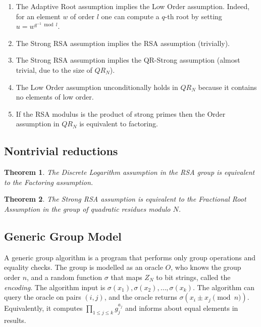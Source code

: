\documentclass[a4paper]{article}
\newtheorem{theorem}{Theorem}
\begin{document}
\begin{enumerate}
    \item The Adaptive Root assumption implies the Low Order assumption. Indeed, for an element $w$ of order $l$ one can compute a $q$-th root by setting $u = w^{q^{-1}\bmod{l}}$. 
    \item The Strong RSA assumption implies the RSA assumption (trivially).
    \item The Strong RSA assumption implies the QR-Strong assumption (almost trivial, due to the size of $QR_N$).
    \item The Low Order assumption unconditionally holds in $QR_N$ because it contains no elements of low order.
    \item If the RSA modulus is the product of strong primes then the Order assumption in $QR_N$ is equivalent to factoring.
\end{enumerate}

\subsection{Nontrivial reductions}
\begin{theorem}\cite{bach1984discrete}
The Discrete Logarithm assumption in the RSA group is equivalent to the Factoring assumption.
\end{theorem}

\begin{theorem}\cite[Th. 1]{DBLP:conf/ccs/CramerS99}
The Strong RSA assumption is equivalent to the Fractional Root Assumption in the group of quadratic residues modulo $N$.
\end{theorem}

\subsection{Generic Group Model}

A generic group algorithm is a program that performs only group operations and equality checks. The group is modelled as an oracle $O$, who knows the group order $n$, and a random function $\sigma$ that maps $Z_N$ to bit strings, called the \emph{encoding}. The algorithm input is $\sigma(x_1),\sigma(x_2),\ldots,\sigma(x_k)$. The algorithm can query the oracle on pairs $(i,j)$, and the oracle returns $\sigma(x_i\pm x_j\pmod{n})$. Equivalently, it computes $\prod_{1\leq j \leq k}g_j^{a_j}$ and informs about equal elements in results.
\end{document}
